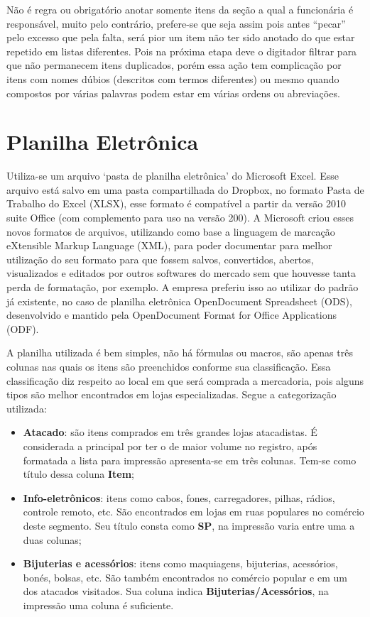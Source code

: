 \documentclass[
	12pt,
	openright,
	oneside, %
	a4paper,
	chapter=TITLE,
	section=TITLE,
	english,
	brazil %
	]{abntex2-udesc}
\begin{document}
Não é regra ou obrigatório anotar somente itens da seção a qual a funcionária é responsável, muito pelo contrário, prefere-se que seja assim pois antes ``pecar'' pelo excesso que pela falta, será pior um item não ter sido anotado do que estar repetido em listas diferentes. Pois na próxima etapa deve o digitador filtrar para que não permanecem itens duplicados, porém essa ação tem complicação por itens com nomes dúbios (descritos com termos diferentes) ou mesmo quando compostos por várias palavras podem estar em várias ordens ou abreviações.

\section{Planilha Eletrônica}

Utiliza-se um arquivo `pasta de planilha eletrônica' do Microsoft Excel. Esse arquivo está salvo em uma pasta compartilhada do Dropbox, no formato Pasta de Trabalho do Excel (XLSX), esse formato é compatível a partir da versão 2010 suite Office (com complemento para uso na versão 200). A Microsoft criou esses novos formatos de arquivos, utilizando como base a linguagem de marcação eXtensible Markup Language (XML), para poder documentar para melhor utilização do seu formato para que fossem salvos, convertidos, abertos, visualizados e editados por outros softwares do mercado sem que houvesse tanta perda de formatação, por exemplo. A empresa preferiu isso ao utilizar do padrão já existente, no caso de planilha eletrônica OpenDocument Spreadsheet (ODS), desenvolvido e mantido pela OpenDocument Format for Office Applications (ODF).

A planilha utilizada é bem simples, não há fórmulas ou macros, são apenas três colunas nas quais os itens são preenchidos conforme sua classificação. Essa classificação diz respeito ao local em que será comprada a mercadoria, pois alguns tipos são melhor encontrados em lojas especializadas. Segue a categorização utilizada:

\begin{itemize}
\item \textbf{Atacado}: são itens comprados em três grandes lojas atacadistas. É considerada a principal por ter o de maior volume no registro, após formatada a lista para impressão apresenta-se em três colunas. Tem-se como título dessa coluna \textbf{Item};
\item \textbf{Info-eletrônicos}: itens como cabos, fones, carregadores, pilhas, rádios, controle remoto, etc. São encontrados em lojas em ruas populares no comércio deste segmento. Seu título consta como \textbf{SP}, na impressão varia entre uma a duas colunas;
\item \textbf{Bijuterias e acessórios}: itens como maquiagens, bijuterias, acessórios, bonés, bolsas, etc. São também encontrados no comércio popular e em um dos atacados visitados. Sua coluna indica \textbf{Bijuterias/Acessórios}, na impressão uma coluna é suficiente.
\end{itemize}
\end{document}
